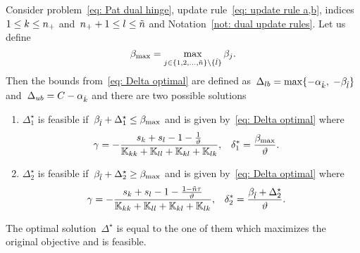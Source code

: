 \begin{lemma}\label{thm: patmat family hinge update a,b}
  Consider problem~\eqref{eq: Pat dual hinge}, update rule~\eqref{eq: update rule a,b}, indices~$1 \leq k \leq n_{+}$ and~$n_{+} + 1 \leq l \leq \tilde{n}$  and Notation~\ref{not: dual update rules}. Let us define
  \begin{equation*}
    \beta_{\max} = \max_{j \in \{1, 2, \ldots, \tilde{n} \} \setminus \{\hat{l}\}} \beta_j.
  \end{equation*}
  Then the bounds from~\eqref{eq: Delta optimal} are defined as~$\Delta_{lb} = \max\{- \alpha_{\hat{k}},\; -\beta_{\hat{l}} \}$ and~$\Delta_{ub} = C - \alpha_{\hat{k}}$ and there are two possible solutions
  \begin{enumerate}
    \item $\Delta^{\star}_1$ is feasible if~$\beta_{\hat{l}} + \Delta^{\star}_1 \leq \beta_{\max}$ and is given by~\eqref{eq: Delta optimal} where
    \begin{align*}
      \gamma
        & = -\frac{s_k + s_l - 1 - \frac{1}{\vartheta}}{\mathbb{K}_{kk} + \mathbb{K}_{ll} + \mathbb{K}_{kl} + \mathbb{K}_{lk}}, &
      \delta^{*}_1
        & = \frac{\beta_{\max}}{\vartheta}.
    \end{align*}
    \item $\Delta^{\star}_2$ is feasible if~$\beta_{\hat{l}} + \Delta^{\star}_2 \geq \beta_{\max}$ and is given by~\eqref{eq: Delta optimal} where
    \begin{align*}
      \gamma
        & = -\frac{s_k + s_l - 1 - \frac{1 - \tilde{n} \tau}{\vartheta}}{\mathbb{K}_{kk} + \mathbb{K}_{ll} + \mathbb{K}_{kl} + \mathbb{K}_{lk}}, &
      \delta^{*}_2
        & = \frac{\beta_{\hat{l}} + \Delta^{\star}_2}{\vartheta}.
    \end{align*}
  \end{enumerate}
  The optimal solution~$\Delta^{\star}$ is equal to the one of them which maximizes the original objective and is feasible.
\end{lemma}

